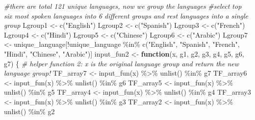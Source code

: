 \documentclass[
]{article}
\newenvironment{Shaded}{\begin{snugshade}}{\end{snugshade}}
\newcommand{\CommentTok}[1]{\textcolor[rgb]{0.56,0.35,0.01}{\textit{#1}}}
\newcommand{\ControlFlowTok}[1]{\textcolor[rgb]{0.13,0.29,0.53}{\textbf{#1}}}
\newcommand{\FunctionTok}[1]{\textcolor[rgb]{0.00,0.00,0.00}{#1}}
\newcommand{\NormalTok}[1]{#1}
\newcommand{\OtherTok}[1]{\textcolor[rgb]{0.56,0.35,0.01}{#1}}
\newcommand{\SpecialCharTok}[1]{\textcolor[rgb]{0.00,0.00,0.00}{#1}}
\newcommand{\StringTok}[1]{\textcolor[rgb]{0.31,0.60,0.02}{#1}}
\begin{document}
\begin{Shaded}
\begin{Highlighting}[]
\CommentTok{\#there are total 121 unique languages, now we group the languages}
\CommentTok{\#select top six most spoken languages into 6 different groups and rest languages into a single group}
\NormalTok{Lgroup1 }\OtherTok{\textless{}{-}} \FunctionTok{c}\NormalTok{(}\StringTok{"English"}\NormalTok{)}
\NormalTok{Lgroup2 }\OtherTok{\textless{}{-}} \FunctionTok{c}\NormalTok{(}\StringTok{"Spanish"}\NormalTok{)}
\NormalTok{Lgroup3 }\OtherTok{\textless{}{-}} \FunctionTok{c}\NormalTok{(}\StringTok{"French"}\NormalTok{)}
\NormalTok{Lgroup4 }\OtherTok{\textless{}{-}} \FunctionTok{c}\NormalTok{(}\StringTok{"Hindi"}\NormalTok{)}
\NormalTok{Lgroup5 }\OtherTok{\textless{}{-}} \FunctionTok{c}\NormalTok{(}\StringTok{"Chinese"}\NormalTok{)}
\NormalTok{Lgroup6 }\OtherTok{\textless{}{-}} \FunctionTok{c}\NormalTok{(}\StringTok{"Arabic"}\NormalTok{)}
\NormalTok{Lgroup7 }\OtherTok{\textless{}{-}}
\NormalTok{  unique\_language[}\SpecialCharTok{!}\NormalTok{unique\_language }\SpecialCharTok{\%in\%} \FunctionTok{c}\NormalTok{(}\StringTok{"English"}\NormalTok{, }\StringTok{"Spanish"}\NormalTok{, }\StringTok{"French"}\NormalTok{, }\StringTok{"Hindi"}\NormalTok{, }\StringTok{"Chinese"}\NormalTok{, }\StringTok{"Arabic"}\NormalTok{)]}
\NormalTok{input\_fun2 }\OtherTok{\textless{}{-}}
  \ControlFlowTok{function}\NormalTok{(x, g1, g2, g3, g4, g5, g6, g7) \{}
    \CommentTok{\# helper function 2: x is the original language group and return the new language group!}
\NormalTok{    TF\_array7 }\OtherTok{\textless{}{-}} \FunctionTok{input\_fun}\NormalTok{(x) }\SpecialCharTok{\%\textgreater{}\%} \FunctionTok{unlist}\NormalTok{() }\SpecialCharTok{\%in\%}\NormalTok{ g7}
\NormalTok{    TF\_array6 }\OtherTok{\textless{}{-}} \FunctionTok{input\_fun}\NormalTok{(x) }\SpecialCharTok{\%\textgreater{}\%} \FunctionTok{unlist}\NormalTok{() }\SpecialCharTok{\%in\%}\NormalTok{ g6}
\NormalTok{    TF\_array5 }\OtherTok{\textless{}{-}} \FunctionTok{input\_fun}\NormalTok{(x) }\SpecialCharTok{\%\textgreater{}\%} \FunctionTok{unlist}\NormalTok{() }\SpecialCharTok{\%in\%}\NormalTok{ g5}
\NormalTok{    TF\_array4 }\OtherTok{\textless{}{-}} \FunctionTok{input\_fun}\NormalTok{(x) }\SpecialCharTok{\%\textgreater{}\%} \FunctionTok{unlist}\NormalTok{() }\SpecialCharTok{\%in\%}\NormalTok{ g4}
\NormalTok{    TF\_array3 }\OtherTok{\textless{}{-}} \FunctionTok{input\_fun}\NormalTok{(x) }\SpecialCharTok{\%\textgreater{}\%} \FunctionTok{unlist}\NormalTok{() }\SpecialCharTok{\%in\%}\NormalTok{ g3}
\NormalTok{    TF\_array2 }\OtherTok{\textless{}{-}} \FunctionTok{input\_fun}\NormalTok{(x) }\SpecialCharTok{\%\textgreater{}\%} \FunctionTok{unlist}\NormalTok{() }\SpecialCharTok{\%in\%}\NormalTok{ g2}

\end{Highlighting}
\end{Shaded}
\end{document}
